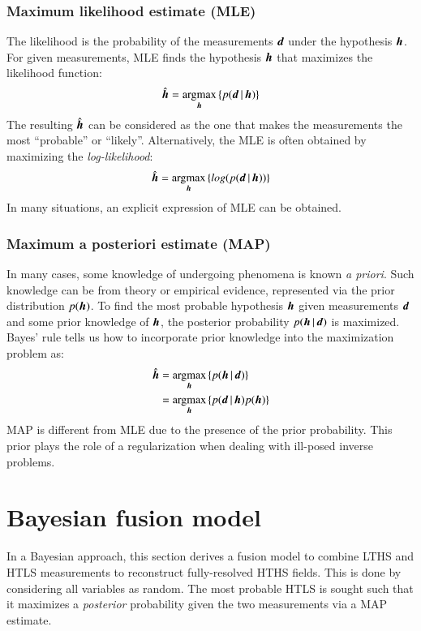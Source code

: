 \subsubsection{Maximum likelihood estimate (MLE)}
The likelihood is the probability of the measurements $ \operatorname{\boldsymbol{d}} $ under the hypothesis $ \operatorname{\boldsymbol{h}} $. For given measurements, MLE finds the hypothesis $ \operatorname{\boldsymbol{h}} $ that maximizes the likelihood function:
\begin{equation}
\hat{\operatorname{\boldsymbol{h}}} = \operatorname*{\arg\!\max}_{\operatorname{\boldsymbol{h}}}{ \left\lbrace p(\operatorname{\boldsymbol{d}}|\operatorname{\boldsymbol{h}}) \right\rbrace}
\end{equation}
The resulting $ \hat{\operatorname{\boldsymbol{h}}} $ can be considered as the one that makes the measurements the most ``probable'' or ``likely''. Alternatively, the MLE is often obtained by maximizing the \textit{log-likelihood}:
\begin{equation}
\hat{\operatorname{\boldsymbol{h}}} = \operatorname*{\arg\!\max}_{\operatorname{\boldsymbol{h}}}{ \left\lbrace log(p(\operatorname{\boldsymbol{d}}|\operatorname{\boldsymbol{h}})) \right\rbrace}
\end{equation}
In many situations, an explicit expression of MLE can be obtained. 

\subsubsection{Maximum a posteriori estimate (MAP)}
In many cases, some knowledge of undergoing phenomena is known \textit{a priori}. Such knowledge can be from theory or empirical evidence, represented via the prior distribution $ p(\operatorname{\boldsymbol{h}}) $. To find the most probable hypothesis $ \operatorname{\boldsymbol{h}} $ given measurements $ \operatorname{\boldsymbol{d}} $ and some prior knowledge of $ \operatorname{\boldsymbol{h}} $, the posterior probability $ p(\operatorname{\boldsymbol{h}}|\operatorname{\boldsymbol{d}}) $ is maximized. Bayes' rule tells us how to incorporate prior knowledge into the maximization problem as: 
\begin{equation}
\begin{split}
\hat{\operatorname{\boldsymbol{h}}} &= \operatorname*{\arg\!\max}_{\operatorname{\boldsymbol{h}}}{ \left\lbrace p(\operatorname{\boldsymbol{h}}|\operatorname{\boldsymbol{d}}) \right\rbrace} \\
					 &= \operatorname*{\arg\!\max}_{\operatorname{\boldsymbol{h}}}{ \left\lbrace p(\operatorname{\boldsymbol{d}}|\operatorname{\boldsymbol{h}}) p(\operatorname{\boldsymbol{h}}) \right\rbrace}
\end{split}
\end{equation}
MAP is different from MLE due to the presence of the prior probability. This prior plays the role of a regularization when dealing with ill-posed inverse problems. 
 
\section{Bayesian fusion model}
\label{sec:Bayesian_fusion_model}
In a Bayesian approach, this section derives a fusion model to combine LTHS and HTLS measurements to reconstruct fully-resolved HTHS fields. This is done by considering all variables as random. The most probable HTLS is sought such that it maximizes a \textit{posterior} probability given the two measurements via a MAP estimate.
 
